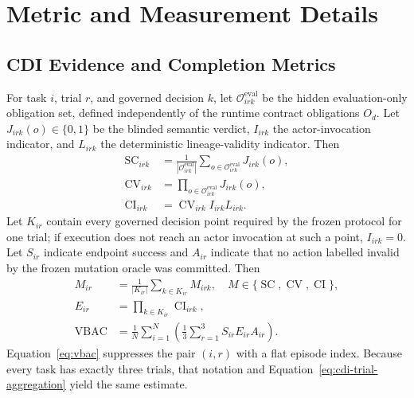 \section{Metric and Measurement Details}
\label{app:metric-details}
\subsection{CDI Evidence and Completion Metrics}
For task $i$, trial $r$, and governed decision $k$, let $\mathcal O^{\mathrm{eval}}_{irk}$ be the hidden evaluation-only obligation set, defined independently of the runtime contract obligations $O_d$. Let $J_{irk}(o)\in\{0,1\}$ be the blinded semantic verdict, $I_{irk}$ the actor-invocation indicator, and $L_{irk}$ the deterministic lineage-validity indicator. Then
\begin{equation}
\begin{aligned}
\operatorname{SC}_{irk}
&=\frac{1}{|\mathcal O^{\mathrm{eval}}_{irk}|}\sum_{o\in\mathcal O^{\mathrm{eval}}_{irk}}J_{irk}(o),\\
\operatorname{CV}_{irk}
&=\prod_{o\in\mathcal O^{\mathrm{eval}}_{irk}}J_{irk}(o),\\
\operatorname{CI}_{irk}
&=\operatorname{CV}_{irk}I_{irk}L_{irk}.
\end{aligned}
\label{eq:cdi-context-metrics}
\end{equation}
Let $K_{ir}$ contain every governed decision point required by the frozen protocol for one trial; if execution does not reach an actor invocation at such a point, $I_{irk}=0$. Let $S_{ir}$ indicate endpoint success and $A_{ir}$ indicate that no action labelled invalid by the frozen mutation oracle was committed. Then
\begin{equation}
\begin{aligned}
M_{ir}&=\frac{1}{|K_{ir}|}\sum_{k\in K_{ir}}M_{irk},
\quad M\in\{\operatorname{SC},\operatorname{CV},\operatorname{CI}\},\\
E_{ir}&=\prod_{k\in K_{ir}}\operatorname{CI}_{irk},\\
\operatorname{VBAC}
&=\frac{1}{N}\sum_{i=1}^{N}
\left(\frac{1}{3}\sum_{r=1}^{3}S_{ir}E_{ir}A_{ir}\right).
\end{aligned}
\label{eq:cdi-trial-aggregation}
\end{equation}
Equation~\eqref{eq:vbac} suppresses the pair $(i,r)$ with a flat episode index. Because every task has exactly three trials, that notation and Equation~\eqref{eq:cdi-trial-aggregation} yield the same estimate.
